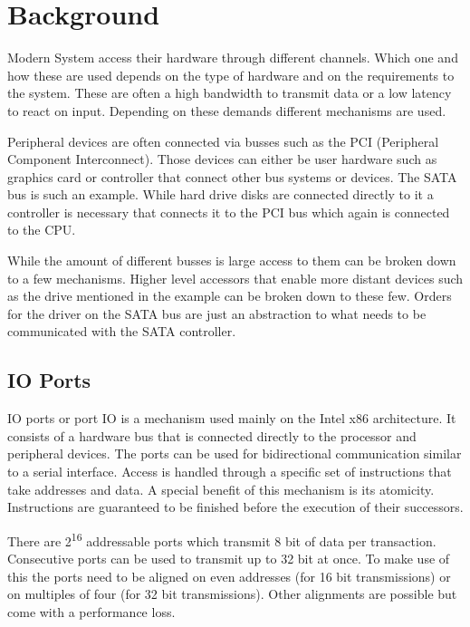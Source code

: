 \documentclass[
a4paper,
12pt,
notitlepage,
parskip=half,
DIV=11,
]{scrbook}
\begin{document}
	\chapter{Background} %

	Modern System access their hardware through different channels.
	Which one and how these are used depends on the type of hardware and on the requirements to the system.
	These are often a high bandwidth to transmit data or a low latency to react on input.
	Depending on these demands different mechanisms are used.
	
	Peripheral devices are often connected via busses such as the PCI (Peripheral Component Interconnect).
	Those devices can either be user hardware such as graphics card or controller that connect other bus systems or devices.
	The SATA bus is such an example.
	While hard drive disks are connected directly to it a controller is necessary that connects it to the PCI bus which again is connected to the CPU.
	
	While the amount of different busses is large access to them can be broken down to a few mechanisms.
	Higher level accessors that enable more distant devices such as the drive mentioned in the example can be broken down to these few.
	Orders for the driver on the SATA bus are just an abstraction to what needs to be communicated with the SATA controller. \citep{iosystems}

	\section{IO Ports}
	
	IO ports or port IO is a mechanism used mainly on the Intel x86 architecture.
	It consists of a hardware bus that is connected directly to the processor and peripheral devices.
	The ports can be used for bidirectional communication similar to a serial interface.
	Access is handled through a specific set of instructions that take addresses and data.
	A special benefit of this mechanism is its atomicity.
	Instructions are guaranteed to be finished before the execution of their successors.
	
	There are 2\textsuperscript{16} addressable ports which transmit 8 bit of data per transaction.
	Consecutive ports can be used to transmit up to 32 bit at once.
	To make use of this the ports need to be aligned on even addresses (for 16 bit transmissions) or on multiples of four (for 32 bit transmissions).
	Other alignments are possible but come with a performance loss.
	
\end{document}

